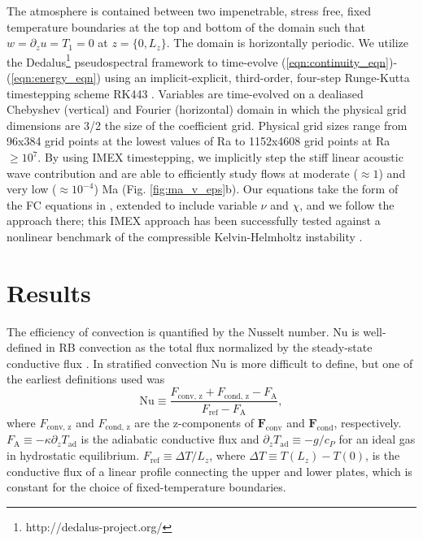 \documentclass[aps, prl, twocolumn, nofootinbib, groupedaddress, amsfonts, amssymb, amsmath]{revtex4-1}
\begin{document}
The atmosphere is contained between two 
impenetrable, stress free, fixed temperature boundaries at
the top and bottom of the domain such that 
$w = \partial_z u = T_1 = 0$ at $z = \{0, L_z\}$. The domain
is horizontally periodic. We utilize the 
Dedalus\footnote{http://dedalus-project.org/} \cite{burns&all2016} pseudospectral framework 
 to time-evolve  
(\ref{eqn:continuity_eqn})-(\ref{eqn:energy_eqn}) 
using an implicit-explicit, third-order, four-step 
Runge-Kutta timestepping scheme RK443 \cite{ascher&all1997}.  
Variables are time-evolved on a dealiased Chebyshev (vertical)
and Fourier (horizontal) domain in which the
physical grid dimensions are 3/2 the size of the coefficient grid.  
Physical grid sizes range from
96x384 grid points at the lowest values of 
Ra to 1152x4608 grid points at Ra $\geq 10^{7}$. 
By using IMEX timestepping, we implicitly step the 
stiff linear acoustic wave contribution and are able to
efficiently study flows at moderate ($\approx 1$) and very low ($\approx 10^{-4}$)
Ma (Fig. \ref{fig:ma_v_eps}b).  Our equations take the form
of the FC equations in \cite{lecoanet&all2014}, extended to include variable
$\nu$ and $\chi$, and we follow the approach there; 
this IMEX approach has been successfully 
tested against a nonlinear benchmark  of the compressible 
Kelvin-Helmholtz instability \cite{Lecoanet_et_al_2016_KH}.

\section{Results}
\label{sec:results}

The efficiency of convection is quantified by the Nusselt number.  
Nu is well-defined in RB convection
as the total flux normalized by the steady-state conductive flux 
\cite{johnston&doering2009, otero&all2002}.
In stratified convection Nu is more difficult to define, but one of the earliest definitions used
was \cite{graham1975,hurlburt&all1984}
\begin{equation}
\text{Nu} \equiv \frac{F_{\text{conv, z}} + F_{\text{cond, z}} - F_{\text{A}}}{F_{\text{ref}} - F_{\text{A}}},
\label{eqn:nusselt}
\end{equation}
where $F_{\text{conv, z}}$ and $F_{\text{cond, z}}$ are the 
z-components of $\bm{F}_{\text{conv}}$ and $\bm{F}_{\text{cond}}$,
respectively.  $F_{\text{A}} \equiv -\kappa \partial_z T_{\text{ad}}$ 
is the adiabatic conductive flux and
$\partial_z T_{\text{ad}} \equiv - g / c_{P}$ 
for an ideal gas in hydrostatic equilibrium.
$F_{\text{ref}} \equiv \Delta T / L_z$, 
where $\Delta T \equiv T(L_z) - T(0)$, is the 
conductive flux of a linear profile connecting the upper
and lower plates, which is constant for 
the choice of fixed-temperature boundaries.
\end{document}

